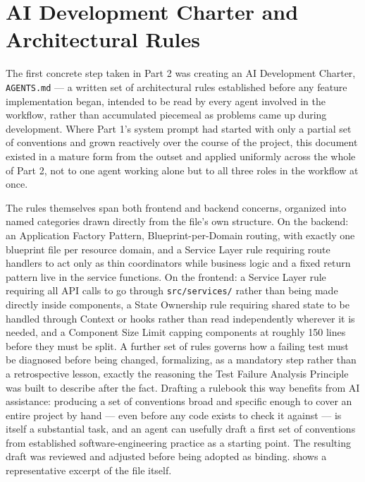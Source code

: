 \section{AI Development Charter and Architectural Rules}

The first concrete step taken in Part 2 was creating an AI Development Charter, \texttt{AGENTS.md} --- a written set of architectural rules established before any feature implementation began, intended to be read by every agent involved in the workflow, rather than accumulated piecemeal as problems came up during development. Where Part 1's system prompt had started with only a partial set of conventions and grown reactively over the course of the project, this document existed in a mature form from the outset and applied uniformly across the whole of Part 2, not to one agent working alone but to all three roles in the workflow at once.

The rules themselves span both frontend and backend concerns, organized into named categories drawn directly from the file's own structure. On the backend: an Application Factory Pattern, Blueprint-per-Domain routing, with exactly one blueprint file per resource domain, and a Service Layer rule requiring route handlers to act only as thin coordinators while business logic and a fixed return pattern live in the service functions. On the frontend: a Service Layer rule requiring all API calls to go through \texttt{src/services/} rather than being made directly inside components, a State Ownership rule requiring shared state to be handled through Context or hooks rather than read independently wherever it is needed, and a Component Size Limit capping components at roughly 150 lines before they must be split. A further set of rules governs how a failing test must be diagnosed before being changed, formalizing, as a mandatory step rather than a retrospective lesson, exactly the reasoning the Test Failure Analysis Principle was built to describe after the fact. Drafting a rulebook this way benefits from AI assistance: producing a set of conventions broad and specific enough to cover an entire project by hand --- even before any code exists to check it against --- is itself a substantial task, and an agent can usefully draft a first set of conventions from established software-engineering practice as a starting point. The resulting draft was reviewed and adjusted before being adopted as binding.  shows a representative excerpt of the file itself.

